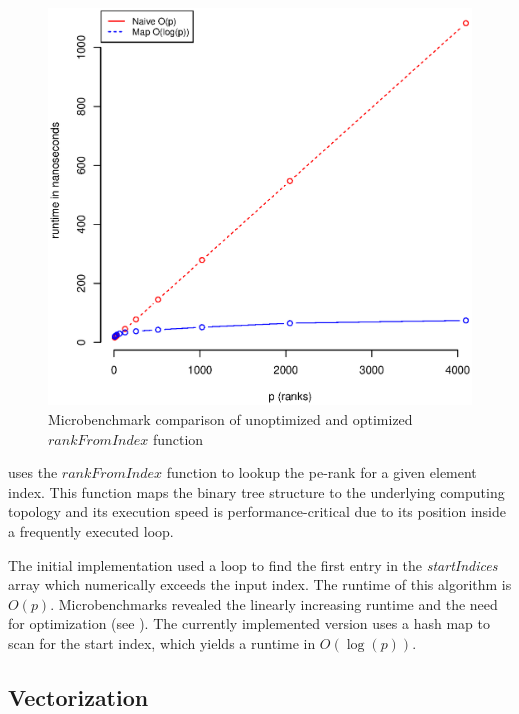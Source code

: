 \begin{figure}
\centering
\includegraphics[scale=0.55]{figures/microbenchmark_rank_from_index.eps}
\caption{Microbenchmark comparison of unoptimized and optimized $rankFromIndex$ function}
\label{fig:microbenchmarkRankFromIndex}

\end{figure}

 uses the $rankFromIndex$ function to lookup the \gls{pe}-rank for a given element index.
This function maps the binary tree structure to the underlying computing topology and its execution speed is performance-critical due to its position inside a frequently executed loop.

The initial implementation used a loop to find the first entry in the \textit{startIndices} array which numerically exceeds the input index.
The runtime of this algorithm is $O(p)$.
Microbenchmarks revealed the linearly increasing runtime and the need for optimization (see ).
The currently implemented version uses a hash map to scan for the start index, which yields a runtime in $O(\log(p))$.

\subsection{Vectorization}
\label{sec:Vectorization}

